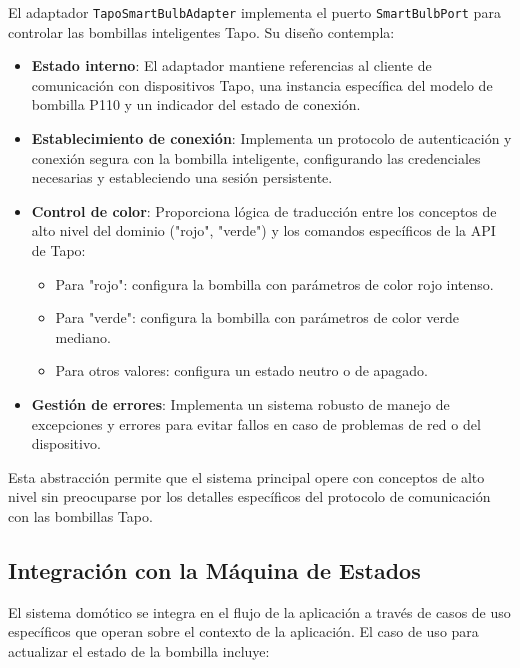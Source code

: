 El adaptador \texttt{TapoSmartBulbAdapter} implementa el puerto \texttt{SmartBulbPort} para controlar las bombillas inteligentes Tapo. Su diseño contempla:

\begin{itemize}
    \item \textbf{Estado interno}: El adaptador mantiene referencias al cliente de comunicación con dispositivos Tapo, una instancia específica del modelo de bombilla P110 y un indicador del estado de conexión.
    
    \item \textbf{Establecimiento de conexión}: Implementa un protocolo de autenticación y conexión segura con la bombilla inteligente, configurando las credenciales necesarias y estableciendo una sesión persistente.
    
    \item \textbf{Control de color}: Proporciona lógica de traducción entre los conceptos de alto nivel del dominio ("rojo", "verde") y los comandos específicos de la API de Tapo:
    \begin{itemize}
        \item Para "rojo": configura la bombilla con parámetros de color rojo intenso.
        \item Para "verde": configura la bombilla con parámetros de color verde mediano.
        \item Para otros valores: configura un estado neutro o de apagado.
    \end{itemize}
    
    \item \textbf{Gestión de errores}: Implementa un sistema robusto de manejo de excepciones y errores para evitar fallos en caso de problemas de red o del dispositivo.
\end{itemize}

Esta abstracción permite que el sistema principal opere con conceptos de alto nivel sin preocuparse por los detalles específicos del protocolo de comunicación con las bombillas Tapo.

\subsection{Integración con la Máquina de Estados}

El sistema domótico se integra en el flujo de la aplicación a través de casos de uso específicos que operan sobre el contexto de la aplicación. El caso de uso para actualizar el estado de la bombilla incluye:

